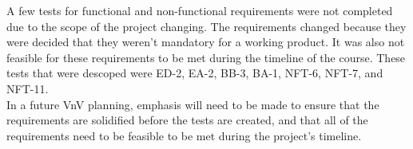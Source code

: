 \documentclass[12pt, titlepage]{article}
\begin{document}
A few tests for functional and non-functional requirements were not completed due to the scope of the project changing. The requirements changed because 
they were decided that they weren't mandatory for a working product. It was also not feasible for these requirements to be met during the timeline of the course.
These tests that were descoped were ED-2, EA-2, BB-3, BA-1, NFT-6, NFT-7, and NFT-11.\\

In a future VnV planning, emphasis will need to be made to ensure that the requirements are solidified before the tests are created, and that all of the requirements need to
be feasible to be met during the project's timeline.



\nocite{*}
\end{document}

